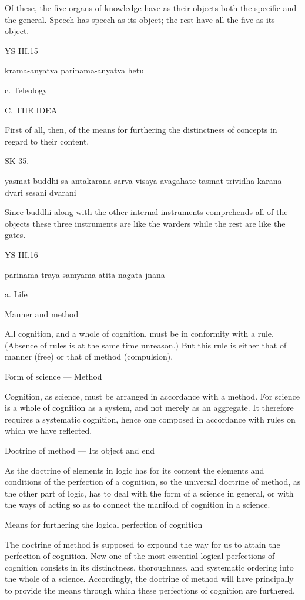 Of these, the five organs of knowledge have as their objects
both the specific and the general.
Speech has speech as its object;
the rest have all the five as its object.

YS III.15

    krama-anyatva parinama-anyatva hetu

    c. Teleology

C. THE IDEA

First of all, then, of the means for furthering
the distinctness of concepts in regard to their content.

SK 35.

yasmat buddhi sa-antakarana sarva visaya avagahate
tasmat trividha karana dvari sesani dvarani

Since buddhi along with the other internal instruments
comprehends all of the objects these three instruments are
like the warders while the rest are like the gates.

YS III.16

    parinama-traya-samyama atita-nagata-jnana

    a. Life

    Manner and method

    All cognition, and a whole of cognition,
    must be in conformity with a rule.
    (Absence of rules is at the same time unreason.)
    But this rule is either that of manner (free)
    or that of method (compulsion).

    Form of science — Method

    Cognition, as science, must be arranged
    in accordance with a method.
    For science is a whole of cognition as a system,
    and not merely as an aggregate.
    It therefore requires a systematic cognition,
    hence one composed in accordance with rules
    on which we have reflected.

    Doctrine of method — Its object and end

    As the doctrine of elements in logic has for its content
    the elements and conditions of the perfection of a cognition,
    so the universal doctrine of method, as the other part of logic,
    has to deal with the form of a science in general,
    or with the ways of acting so as to connect
    the manifold of cognition in a science.

    Means for furthering the logical perfection of cognition

    The doctrine of method is supposed to expound the way
    for us to attain the perfection of cognition.
    Now one of the most essential logical perfections of cognition
    consists in its distinctness, thoroughness, and systematic ordering
    into the whole of a science.
    Accordingly, the doctrine of method will have principally to provide
    the means through which these perfections of cognition are furthered.

